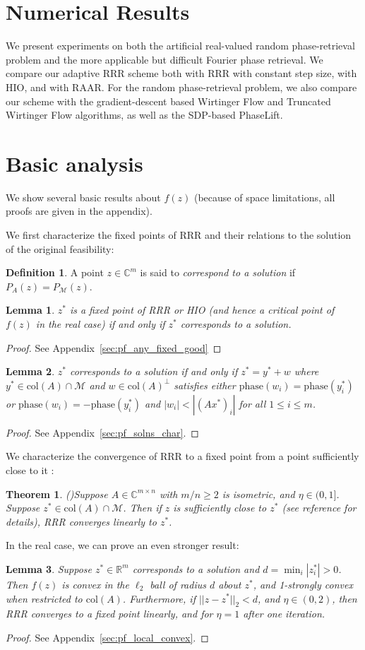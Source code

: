 \documentclass[journal]{IEEEtran}
\newtheorem{theorem}{Theorem}
\newtheorem{lemma}{Lemma}
\theoremstyle{definition}
\newtheorem{definition}{Definition}
\theoremstyle{remark}
\theoremstyle{definition}
\theoremstyle{problem}
\theoremstyle{definition}
\newcommand{\bthm}{\begin{theorem}}
\newcommand{\ethm}{\end{theorem}}
\newcommand{\blem}{\begin{lemma}}
\newcommand{\elem}{\end{lemma}}
\newcommand{\bpof}{\begin{proof}}
\newcommand{\epof}{\end{proof}}
\newcommand{\bdefn}{\begin{definition}}
\newcommand{\edefn}{\end{definition}}
\newcommand{\col}{\text{col}}
\newcommand{\RR}{\mathbb{R} }
\newcommand{\CC}{\mathbb{C}}
\newcommand{\MM}{\mathcal{M}}
\newcommand{\TODO}[1]{{\color{red}{[#1]}}}
\begin{document}
\section{Numerical Results}
\TODO{Address noise}

We present experiments on both the artificial real-valued random phase-retrieval problem and the more applicable but difficult Fourier phase retrieval. We compare our adaptive RRR scheme both with RRR with constant step size, with HIO, and with RAAR. For the random phase-retrieval problem, we also compare our scheme with the gradient-descent based Wirtinger Flow and Truncated Wirtinger Flow algorithms, as well as the SDP-based PhaseLift.

\section{Basic analysis}
We show several basic results about $f(z)$ (because of space limitations, all proofs are given in the appendix).

We first characterize the fixed points of RRR and their relations to the solution of the original feasibility:
\bdefn\label{defn:soln} A point $z\in\CC^m$ is said to \emph{correspond to a solution} if $P_A(z) = P_{\MM}(z)$. \edefn

\blem\label{lem:any_fixed_is_good} $z^*$ is a fixed point of RRR or HIO (and hence a critical point of $f(z)$ in the real case) if and only if $z^*$ corresponds to a solution. \elem
\bpof See Appendix~\ref{sec:pf_any_fixed_good} \epof

\blem\label{lem:solns_char} $z^*$ corresponds to a solution if and only if $z^* = y^* + w$ where $y^*\in\col(A)\cap \MM$ and $w\in\col(A)^{\perp}$ satisfies either $\text{phase}(w_i) = \text{phase}(y^*_i)$ or $\text{phase}(w_i) = -\text{phase}(y^*_i)$ and $|w_i|<|(Ax^*)_i|$ for all $1\leq i\leq m$. \elem
\bpof  See Appendix~\ref{sec:pf_solns_char}. \epof

We characterize the convergence of RRR to a fixed point from a point sufficiently close to it \TODO{in its basin of attraction?}:
\bthm\emph{(\cite[Thm. 3]{Li2017a})}\label{lem:lin_conver} Suppose $A\in\CC^{m\times n}$ with $m/n\geq 2$ is isometric, and $\eta\in(0,1]$. Suppose $z^*\in\col(A)\cap\MM$. Then if $z$ is sufficiently close to $z^*$ (see reference for details), RRR converges linearly to $z^*$. \ethm

In the real case, we can prove an even stronger result:
\blem\label{lem:local_convex} Suppose $z^*\in\RR^m$ corresponds to a solution and $d = \min_i|z^*_i| > 0$. Then $f(z)$ is convex in the $\ell_2$ ball of radius $d$ about $z^*$, and 1-strongly convex when restricted to $\col(A)$. Furthermore, if $||z-z^*||_2<d$, and $\eta\in(0,2)$, then RRR converges to a fixed point linearly, and for $\eta=1$ after one iteration. \elem
\bpof See Appendix~\ref{sec:pf_local_convex}. \epof
\end{document}
